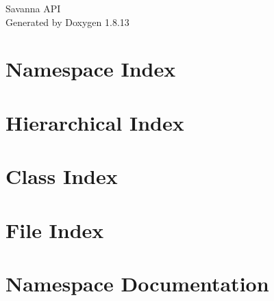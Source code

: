 \documentclass[twoside]{book}
\newcommand{\+}{\discretionary{\mbox{\scriptsize$\hookleftarrow$}}{}{}}
\newcommand{\clearemptydoublepage}{%
  \newpage{\pagestyle{empty}\cleardoublepage}%
}
\begin{document}
\hypersetup{pageanchor=false,
             bookmarksnumbered=true,
             pdfencoding=unicode
            }
\begin{titlepage}
\vspace*{7cm}
\begin{center}%
{\Large Savanna A\+PI }\\
\vspace*{1cm}
{\large Generated by Doxygen 1.8.13}\\
\end{center}
\end{titlepage}
\clearemptydoublepage
{}
\tableofcontents
\clearemptydoublepage
{}
\hypersetup{pageanchor=true}

\chapter{Namespace Index}

\chapter{Hierarchical Index}

\chapter{Class Index}

\chapter{File Index}

\chapter{Namespace Documentation}













\end{document}
